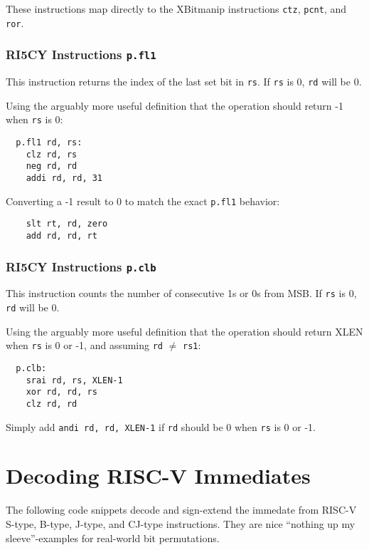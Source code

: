 These instructions map directly to the XBitmanip instructions {\tt ctz}, {\tt pcnt}, and {\tt ror}.

\subsubsection{RI5CY Instructions {\tt p.fl1}}

This instruction returns the index of the last set bit in {\tt rs}. If {\tt rs} is 0, {\tt rd} will be 0.

Using the arguably more useful definition that the operation should return -1 when {\tt rs} is 0:

\begin{verbatim}
  p.fl1 rd, rs:
    clz rd, rs
    neg rd, rd
    addi rd, rd, 31
\end{verbatim}

Converting a -1 result to 0 to match the exact {\tt p.fl1} behavior:

\begin{verbatim}
    slt rt, rd, zero
    add rd, rd, rt
\end{verbatim}

\subsubsection{RI5CY Instructions {\tt p.clb}}

This instruction counts the number of consecutive 1s or 0s from MSB. If {\tt rs} is 0, {\tt rd} will be 0.

Using the arguably more useful definition that the operation should return XLEN when {\tt rs} is 0 or -1,
and assuming {\tt rd} $\ne$ {\tt rs1}:

\begin{verbatim}
  p.clb:
    srai rd, rs, XLEN-1
    xor rd, rd, rs
    clz rd, rd
\end{verbatim}

Simply add {\tt andi rd, rd, XLEN-1} if {\tt rd} should be 0 when {\tt rs} is 0 or -1.

\section{Decoding RISC-V Immediates}

The following code snippets decode and sign-extend the immedate from RISC-V
S-type, B-type, J-type, and CJ-type instructions. They are nice ``nothing up my
sleeve''-examples for real-world bit permutations.

